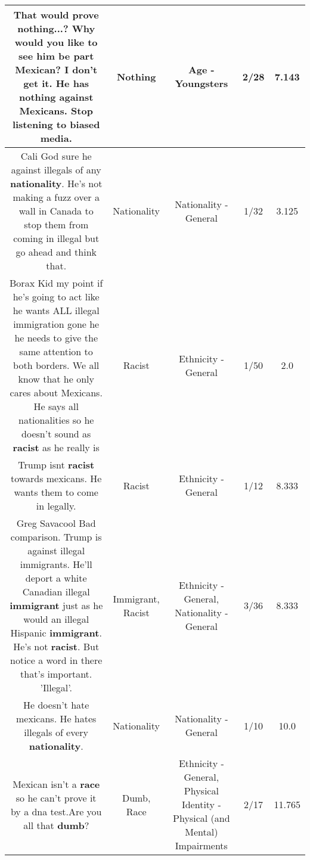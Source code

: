 \documentclass[11pt]{article}
\newlength\mylength
\begin{document}
\begin{center}
\begin{longtable}{|C{.65\mylength}|C{.30\mylength}|C{.12\mylength}|C{.12\mylength}|C{.12\mylength}|}
  \small That would prove \textbf{nothing}...? Why would you like to see him be part Mexican? I don't get it. He has \textbf{nothing} against Mexicans. Stop listening to biased media.\normalsize   & Nothing & Age - Youngsters & 2/28 & 7.143 \\  \hline
  \small Cali God sure he against illegals of any \textbf{nationality}. He's not making a fuzz over a wall in Canada to stop them from coming in illegal but go ahead and think that.\normalsize   & Nationality & Nationality - General & 1/32 & 3.125 \\  \hline
  \small Borax Kid my point if he's going to act like he wants ALL illegal immigration gone he he needs to give the same attention to both borders. We all know that he only cares about Mexicans. He says all nationalities so he doesn't sound as \textbf{racist} as he really is\normalsize   & Racist & Ethnicity - General & 1/50 & 2.0 \\  \hline
  \small Trump isnt \textbf{racist} towards mexicans. He wants them to come in legally.\normalsize   & Racist & Ethnicity - General & 1/12 & 8.333 \\  \hline
  \small Greg Savacool Bad comparison. Trump is against illegal immigrants. He'll deport a white Canadian illegal \textbf{immigrant} just as he would an illegal Hispanic \textbf{immigrant}. He's not \textbf{racist}. But notice a word in there that's important. 'Illegal'.\normalsize   & Immigrant, Racist & Ethnicity - General, Nationality - General & 3/36 & 8.333 \\  \hline
  \small He doesn't hate mexicans. He hates illegals of every \textbf{nationality}.\normalsize   & Nationality & Nationality - General & 1/10 & 10.0 \\  \hline
  \small Mexican isn't a \textbf{race} so he can't prove it by a dna test.Are you all that \textbf{dumb}?\normalsize   & Dumb, Race & Ethnicity - General, Physical Identity - Physical (and Mental) Impairments & 2/17 & 11.765 \\  \hline

\end{longtable}
\end{center}
\end{document}
